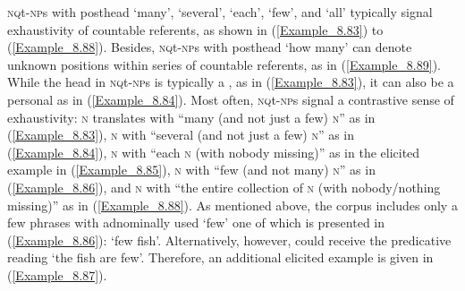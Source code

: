 \textsc{nq}t\textsc{{}-np}s with posthead  ‘many’,  ‘several’,  ‘each’,  ‘few’, and  ‘all’ typically signal exhaustivity of  countable referents, as shown in (\ref{Example_8.83}) to (\ref{Example_8.88}). Besides, \textsc{nq}t\textsc{{}-np}s with posthead  ‘how many’ can denote unknown positions within series of countable referents, as in (\ref{Example_8.89}). While the head in \textsc{nq}t\textsc{{}-np}s is typically a , as in (\ref{Example_8.83}), it can also be a personal  as in (\ref{Example_8.84}).
Most often,\textsc{ nq}t\textsc{{}-np}s signal a contrastive sense of exhaustivity: \textsc{n}  translates with ``many (and not just a few) \textsc{n}'' as in (\ref{Example_8.83}), \textsc{n}  with ``several (and not just a few) \textsc{n}'' as in (\ref{Example_8.84}), \textsc{n}  with ``each \textsc{n }(with nobody missing)'' as in the elicited example in (\ref{Example_8.85}), \textsc{n}  with ``few (and not many) \textsc{n}'' as in (\ref{Example_8.86}), and \textsc{n}  with ``the entire collection of \textsc{n} (with nobody/nothing missing)'' as in (\ref{Example_8.88}). As mentioned above, the corpus includes only a few  phrases with adnominally used  ‘few’ one of which is presented in (\ref{Example_8.86}):  ‘few fish’. Alternatively, however,  could receive the predicative reading ‘the fish are few’. Therefore, an additional elicited example is given in (\ref{Example_8.87}).



